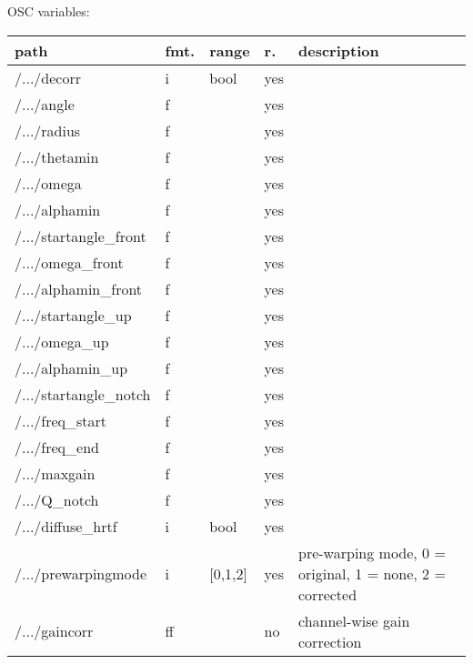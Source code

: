 \begin{snugshade}
{\footnotesize
\label{osctab:receivermodhrtf}
OSC variables:
\nopagebreak

\begin{tabularx}{\textwidth}{llllX}
\hline
path & fmt. & range & r. & description\\
\hline
/.../decorr & i & bool & yes & \\
/.../angle & f &  & yes & \\
/.../radius & f &  & yes & \\
/.../thetamin & f &  & yes & \\
/.../omega & f &  & yes & \\
/.../alphamin & f &  & yes & \\
/.../startangle\_front & f &  & yes & \\
/.../omega\_front & f &  & yes & \\
/.../alphamin\_front & f &  & yes & \\
/.../startangle\_up & f &  & yes & \\
/.../omega\_up & f &  & yes & \\
/.../alphamin\_up & f &  & yes & \\
/.../startangle\_notch & f &  & yes & \\
/.../freq\_start & f &  & yes & \\
/.../freq\_end & f &  & yes & \\
/.../maxgain & f &  & yes & \\
/.../Q\_notch & f &  & yes & \\
/.../diffuse\_hrtf & i & bool & yes & \\
/.../prewarpingmode & i & [0,1,2] & yes & pre-warping mode, 0 = original, 1 = none, 2 = corrected\\
/.../gaincorr & ff &  & no & channel-wise gain correction\\
\hline
\end{tabularx}
}
\end{snugshade}
